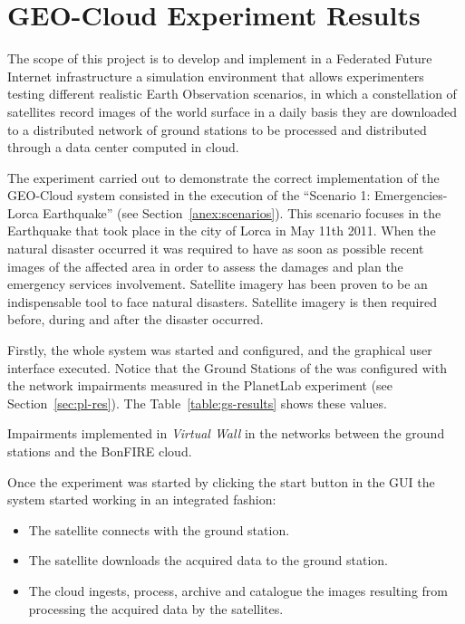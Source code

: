 \section{GEO-Cloud Experiment Results}
\label{sec:geocloud-results}

The scope of this project is to develop and implement in a Federated Future
Internet infrastructure a simulation environment that allows experimenters
testing different realistic Earth Observation scenarios, in which a
constellation of satellites record images of the world surface in a daily basis
they are downloaded to a distributed network of ground stations to be processed and
distributed through a data center computed in cloud.

The experiment carried out to demonstrate the correct implementation of the
GEO-Cloud system consisted in the execution of the ``Scenario 1: Emergencies-Lorca Earthquake'' (see Section~\ref{anex:scenarios}). This scenario focuses in the Earthquake that
took place in the city of Lorca in May 11th 2011. When the natural disaster occurred
it was required to have as soon as possible recent images of the affected area in
order to assess the damages and plan the emergency services
involvement. Satellite imagery has been proven to be an indispensable tool to
face natural disasters. Satellite imagery is then required before, during and
after the disaster occurred. 

Firstly, the whole system was started and configured, and the graphical user
interface executed. Notice that the Ground Stations of the \sss was configured with
the network impairments measured in the PlanetLab experiment (see
Section~\ref{sec:pl-res}). The Table~\ref{table:gs-results} shows these values.

\begin{table}[!h]
  \centering
  {\small
  
  }
  \caption{Impairments implemented in \emph{Virtual Wall} in the networks between the ground stations and the BonFIRE cloud.}
  \label{table:gs-results}
\end{table}



Once the experiment was started by clicking the start button in the \ac{GUI} the system started working in an integrated fashion:
\begin{itemize}
\item The satellite connects with the ground station.
\item The satellite downloads the acquired data to the ground station.
\item The cloud ingests, process, archive and catalogue the images resulting
  from processing the acquired data by the satellites.
\end{itemize}


